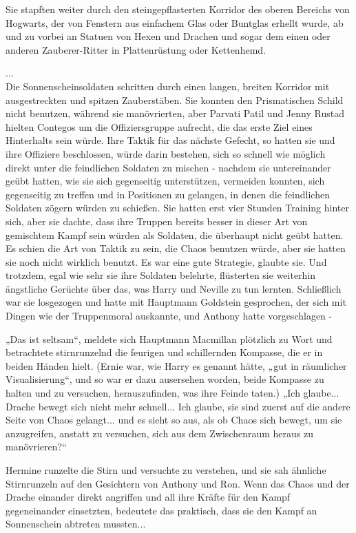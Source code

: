 {Sie stapften weiter durch den steingepflasterten Korridor des oberen Bereichs von Hogwarts, der von Fenstern aus einfachem Glas oder Buntglas erhellt wurde, ab und zu vorbei an Statuen von Hexen und Drachen und sogar dem einen oder anderen Zauberer-Ritter in Plattenrüstung oder Kettenhemd.

...\\ Die Sonnenscheinsoldaten schritten durch einen langen, breiten Korridor mit ausgestreckten und spitzen Zauberstäben. Sie konnten den Prismatischen Schild nicht benutzen, während sie manövrierten, aber Parvati Patil und Jenny Rustad hielten Contegos um die Offiziersgruppe aufrecht, die das erste Ziel eines Hinterhalts sein würde. Ihre Taktik für das nächste Gefecht, so hatten sie und ihre Offiziere beschlossen, würde darin bestehen, sich so schnell wie möglich direkt unter die feindlichen Soldaten zu mischen - nachdem sie untereinander geübt hatten, wie sie sich gegenseitig unterstützen, vermeiden konnten, sich gegenseitig zu treffen und in Positionen zu gelangen, in denen die feindlichen Soldaten zögern würden zu schießen. Sie hatten erst vier Stunden Training hinter sich, aber sie dachte, dass ihre Truppen bereits besser in dieser Art von gemischtem Kampf sein würden als Soldaten, die überhaupt nicht geübt hatten. Es schien die Art von Taktik zu sein, die Chaos benutzen würde, aber sie hatten sie noch nicht wirklich benutzt. Es war eine gute Strategie, glaubte sie. Und trotzdem, egal wie sehr sie ihre Soldaten belehrte, flüsterten sie weiterhin ängstliche Gerüchte über das, was Harry und Neville zu tun lernten. Schließlich war sie losgezogen und hatte mit Hauptmann Goldstein gesprochen, der sich mit Dingen wie der Truppenmoral auskannte, und Anthony hatte vorgeschlagen -

„Das ist seltsam“, meldete sich Hauptmann Macmillan plötzlich zu Wort und betrachtete stirnrunzelnd die feurigen und schillernden Kompasse, die er in beiden Händen hielt. (Ernie war, wie Harry es genannt hätte, „gut in räumlicher Visualisierung“, und so war er dazu ausersehen worden, beide Kompasse zu halten und zu versuchen, herauszufinden, was ihre Feinde taten.) „Ich glaube... Drache bewegt sich nicht mehr schnell... Ich glaube, sie sind zuerst auf die andere Seite von Chaos gelangt... und es sieht so aus, als ob Chaos sich bewegt, um sie anzugreifen, anstatt zu versuchen, sich aus dem Zwischenraum heraus zu manövrieren?“

Hermine runzelte die Stirn und versuchte zu verstehen, und sie sah ähnliche Stirnrunzeln auf den Gesichtern von Anthony und Ron. Wenn das Chaos und der Drache einander direkt angriffen und all ihre Kräfte für den Kampf gegeneinander einsetzten, bedeutete das praktisch, dass sie den Kampf an Sonnenschein abtreten mussten...

}
